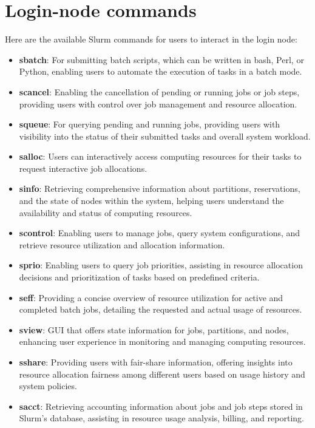 \section{Login-node commands}

Here are the available Slurm commands for users to interact in the login node:

\begin{itemize}
    \item \textbf{sbatch}: For submitting batch scripts, which can be written in bash, Perl, or Python, enabling users to automate the execution of tasks in a batch mode.
    \item \textbf{scancel}: Enabling the cancellation of pending or running jobs or job steps, providing users with control over job management and resource allocation.
    \item \textbf{squeue}: For querying pending and running jobs, providing users with visibility into the status of their submitted tasks and overall system workload.
    \item \textbf{salloc}: Users can interactively access computing resources for their tasks to request interactive job allocations.
    \item \textbf{sinfo}: Retrieving comprehensive information about partitions, reservations, and the state of nodes within the system, helping users understand the availability and status of computing resources.
    \item \textbf{scontrol}: Enabling users to manage jobs, query system configurations, and retrieve resource utilization and allocation information.
    \item \textbf{sprio}: Enabling users to query job priorities, assisting in resource allocation decisions and prioritization of tasks based on predefined criteria.
    \item \textbf{seff}: Providing a concise overview of resource utilization for active and completed batch jobs, detailing the requested and actual usage of resources.
    \item \textbf{sview}: GUI that offers state information for jobs, partitions, and nodes, enhancing user experience in monitoring and managing computing resources.
    \item \textbf{sshare}: Providing users with fair-share information, offering insights into resource allocation fairness among different users based on usage history and system policies.
    \item \textbf{sacct}: Retrieving accounting information about jobs and job steps stored in Slurm's database, assisting in resource usage analysis, billing, and reporting.

\end{itemize}
